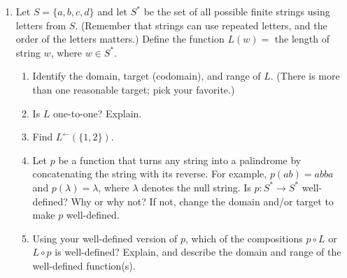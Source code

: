 \documentclass{article}
\begin{document}
\begin{enumerate}
\item Let $S =\{a,b,c,d\}$ and let $S^*$ be the set of all possible finite strings using letters from $S$. (Remember that strings can use repeated letters, and the order of the letters matters.)  Define the function $L(w) = $ the length of string $w$, where $w \in S^*$.
\begin{enumerate}
	\item Identify the domain, target (codomain), and range of $L$. (There is more than one reasonable target; pick your favorite.)
	\item Is $L$ one-to-one?  Explain.
	\item Find $L^{\leftarrow}(\{1,2\})$. 
	\item Let $p$ be a function that turns any string into a palindrome by concatenating the string with its reverse.  For example, $p(ab) = abba$ and $p(\lambda)=\lambda$, where $\lambda$ denotes the null string. Is $p:S^* \to S^*$ well-defined?  Why or why not?  If not, change the domain and/or target to make $p$ well-defined.
	\item Using your well-defined version of $p$, which of the compositions $p \circ L$  or $L \circ p$ is well-defined? Explain, and describe the domain and range of the well-defined function(s).
\end{enumerate}

\end{enumerate}
\end{document}
